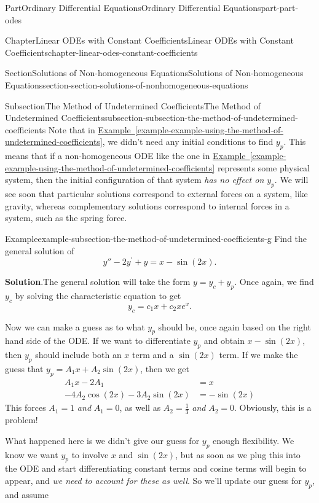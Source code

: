 \documentclass[twoside,10pt,]{book}
\newcommand{\blocktitlefont}{\relax}
\newcommand{\xreffont}{\relax}
\numberwithin{equation}{part}
\begin{document}
\begin{partptx}{Part}{Ordinary Differential Equations}{}{Ordinary Differential Equations}{}{}{part-part-odes}
\begin{chapterptx}{Chapter}{Linear ODEs with Constant Coefficients}{}{Linear ODEs with Constant Coefficients}{}{}{chapter-linear-odes-constant-coefficients}
\begin{sectionptx}{Section}{Solutions of Non-homogeneous Equations}{}{Solutions of Non-homogeneous Equations}{}{}{section-section-solutions-of-nonhomogeneous-equations}
\begin{subsectionptx}{Subsection}{The Method of Undetermined Coefficients}{}{The Method of Undetermined Coefficients}{}{}{subsection-subsection-the-method-of-undetermined-coefficients}
Note that in \hyperref[example-example-using-the-method-of-undetermined-coefficients]{Example~{\xreffont\ref{example-example-using-the-method-of-undetermined-coefficients}}}, we didn't need any initial conditions to find \(y_{p}\). This means that if a non-homogeneous ODE like the one in \hyperref[example-example-using-the-method-of-undetermined-coefficients]{Example~{\xreffont\ref{example-example-using-the-method-of-undetermined-coefficients}}} represents some physical system, then the initial configuration of that system \emph{has no effect on \(y_{p}\)}. We will see soon that particular solutions correspond to external forces on a system, like gravity, whereas complementary solutions correspond to internal forces in a system, such as the spring force.%
\begin{example}{Example}{}{example-subsection-the-method-of-undetermined-coefficients-g}%
Find the general solution of%
\begin{equation*}
y'' - 2y^\prime + y = x - \sin(2x).
\end{equation*}
%
\par\smallskip%
\noindent\textbf{\blocktitlefont Solution}.\hypertarget{solution-subsection-the-method-of-undetermined-coefficients-g-b}{}\quad{}The general solution will take the form \(y = y_{c} + y_{p}\). Once again, we find \(y_{c}\) by solving the characteristic equation to get%
\begin{equation*}
y_{c} = c_{1}x + c_{2}xe^{x}.
\end{equation*}
%
\par
Now we can make a guess as to what \(y_{p}\) should be, once again based on the right hand side of the ODE. If we want to differentiate \(y_{p}\) and obtain \(x - \sin(2x)\), then \(y_{p}\) should include both an \(x\) term and a \(\sin(2x)\) term. If we make the guess that \(y_{p} = A_{1}x + A_{2}\sin(2x)\), then we get%
\begin{align*}
A_{1}x - 2A_{1} & = x \\
-4A_{2}\cos(2x) - 3A_{2}\sin(2x) & = -\sin(2x) 
\end{align*}
This forces \(A_{1} = 1\) \emph{and} \(A_{1} = 0\), as well as \(A_{2} = \frac{1}{3}\) \emph{and} \(A_{2} = 0\). Obviously, this is a problem!%
\par
What happened here is we didn't give our guess for \(y_{p}\) enough flexibility. We know we want \(y_{p}\) to involve \(x\) and \(\sin(2x)\), but as soon as we plug this into the ODE and start differentiating constant terms and cosine terms will begin to appear, and \emph{we need to account for these as well}. So we'll update our guess for \(y_{p}\), and assume%

\end{example}
\end{subsectionptx}
\end{sectionptx}
\end{chapterptx}
\end{partptx}
\end{document}
